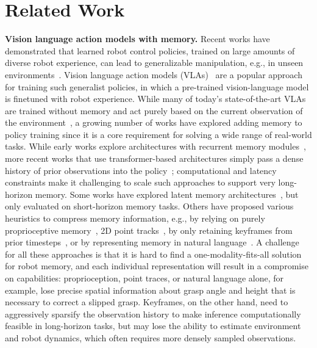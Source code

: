 \section{Related Work}
\label{sec:related_work}


\noindent \textbf{Vision language action models with memory.} 
Recent works have demonstrated that learned robot control policies, trained on large amounts of diverse robot experience, can lead to generalizable manipulation, e.g., in unseen environments~\citep{pi05, blackpi0, geminirobotics, lbmtri2025, nvidia2025gr00tn1openfoundation,ye2026worldactionmodelszeroshot}. Vision language action models (VLAs)~\citep{driess2023palm, rt22023arxiv, open_x_embodiment_rt_x_2023, octo_2023, Doshi24-crossformer, kim2024openvla, black2024pi_0, wen2024tinyvlafastdataefficientvisionlanguageaction, zhen20243dvla, belkhale2024minivla, szot2024multimodal, pertsch2025fast, geminirobotics2025, wen2025dexvla, bjorck2025gr00t, wu2026pragmatic, team2026gigabrain} are a popular approach for training such generalist policies, in which a pre-trained vision-language model is finetuned with robot experience. While many of today's state-of-the-art VLAs are trained without memory and act purely based on the current observation of the environment~\citep{kim2024openvla, blackpi0, pi05, geminirobotics, lbmtri2025, nvidia2025gr00tn1openfoundation}, a growing number of works have explored adding memory to policy training since it is a core requirement for solving a wide range of real-world tasks. While early works explore architectures with recurrent memory modules~\citep{rahmatizadeh2018vision, mandlekar2021matters}, more recent works that use transformer-based architectures simply pass a dense history of prior observations into the policy~\citep{shafiullah2022behavior, lee2024behavior, octo_2023}; computational and latency constraints make it challenging to scale such approaches to support very long-horizon memory. Some works have explored latent memory architectures~\citep{li2025cronusvla, shi2025memoryvla, fang2025sam2act, chung2025rethinking}, but only evaluated on short-horizon memory tasks. Others have proposed various heuristics to compress memory information, e.g., by relying on purely proprioceptive memory~\citep{zhang2025ta}, 2D point tracks~\citep{zheng2024tracevla, chen2025history}, by only retaining keyframes from prior timesteps~\citep{sridhar2025memer, wei2025cyclemanip, mark2026bpp}, or by representing memory in natural language~\citep{lin2025onetwovla}. %
A challenge for all these approaches is that it is hard to find a one-modality-fits-all solution for robot memory, and each individual representation will result in a compromise on capabilities: proprioception, point traces, or natural language alone, for example, lose precise spatial information about grasp angle and height that is necessary to correct a slipped grasp. Keyframes, on the other hand, need to aggressively sparsify the observation history to make inference computationally feasible in long-horizon tasks, but may lose the ability to estimate environment and robot dynamics, which often requires more densely sampled observations. 
